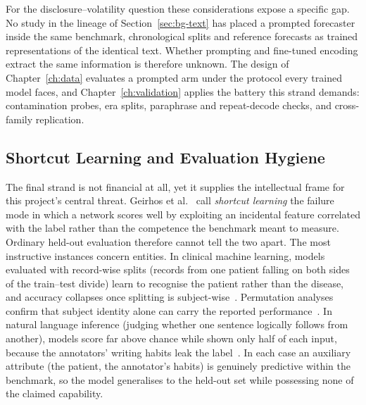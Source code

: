 For the disclosure--volatility question these considerations expose a specific gap. No study in the lineage of Section~\ref{sec:bg-text} has placed a prompted forecaster inside the same benchmark, chronological splits and reference forecasts as trained representations of the identical text. Whether prompting and fine-tuned encoding extract the same information is therefore unknown. The design of Chapter~\ref{ch:data} evaluates a prompted arm under the protocol every trained model faces, and Chapter~\ref{ch:validation} applies the battery this strand demands: contamination probes, era splits, paraphrase and repeat-decode checks, and cross-family replication.

\subsection{Shortcut Learning and Evaluation Hygiene}
\label{sec:bg-shortcut}

The final strand is not financial at all, yet it supplies the intellectual frame for this project's central threat. Geirhos et al.~\cite{geirhos2020shortcut} call \emph{shortcut learning} the failure mode in which a network scores well by exploiting an incidental feature correlated with the label rather than the competence the benchmark meant to measure. Ordinary held-out evaluation therefore cannot tell the two apart. The most instructive instances concern entities. In clinical machine learning, models evaluated with record-wise splits (records from one patient falling on both sides of the train--test divide) learn to recognise the patient rather than the disease, and accuracy collapses once splitting is subject-wise~\cite{saeb2017leakage}. Permutation analyses confirm that subject identity alone can carry the reported performance~\cite{chaibubneto2017identity}. In natural language inference (judging whether one sentence logically follows from another), models score far above chance while shown only half of each input, because the annotators' writing habits leak the label~\cite{gururangan2018annotation,poliak2018hypothesis}. In each case an auxiliary attribute (the patient, the annotator's habits) is genuinely predictive within the benchmark, so the model generalises to the held-out set while possessing none of the claimed capability.

